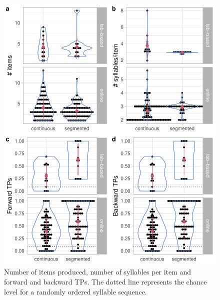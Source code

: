 \documentclass[]{article}
\begin{document}
\begin{figure}

{\centering \includegraphics[width=0.8\linewidth]{segmentation_recall_combined_files/figure-latex/recall-general-measures-tp-plot-1} 

}

\caption{Number of items produced, number of syllables per item and forward and backward TPs. The dotted line represents the chance level for a randomly ordered syllable sequence.}\label{fig:recall-general-measures-tp-plot}
\end{figure}
\end{document}
